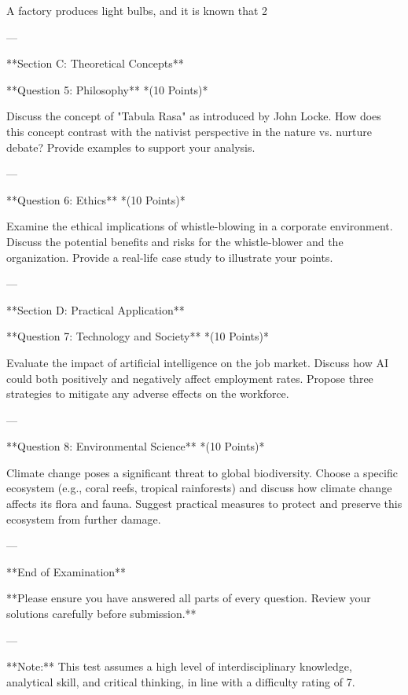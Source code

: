 \documentclass{article}
\begin{document}
A factory produces light bulbs, and it is known that 2%

---

**Section C: Theoretical Concepts**

**Question 5: Philosophy**  
*(10 Points)*

Discuss the concept of "Tabula Rasa" as introduced by John Locke. How does this concept contrast with the nativist perspective in the nature vs. nurture debate? Provide examples to support your analysis.

---

**Question 6: Ethics**  
*(10 Points)*

Examine the ethical implications of whistle-blowing in a corporate environment. Discuss the potential benefits and risks for the whistle-blower and the organization. Provide a real-life case study to illustrate your points.

---

**Section D: Practical Application**

**Question 7: Technology and Society**  
*(10 Points)*

Evaluate the impact of artificial intelligence on the job market. Discuss how AI could both positively and negatively affect employment rates. Propose three strategies to mitigate any adverse effects on the workforce.

---

**Question 8: Environmental Science**  
*(10 Points)*

Climate change poses a significant threat to global biodiversity. Choose a specific ecosystem (e.g., coral reefs, tropical rainforests) and discuss how climate change affects its flora and fauna. Suggest practical measures to protect and preserve this ecosystem from further damage.

---

**End of Examination**

**Please ensure you have answered all parts of every question. Review your solutions carefully before submission.**

---

**Note:** This test assumes a high level of interdisciplinary knowledge, analytical skill, and critical thinking, in line with a difficulty rating of 7.
\end{document}
